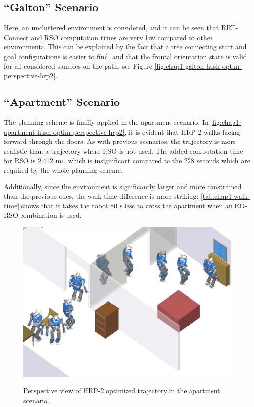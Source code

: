 \subsection{``Galton'' Scenario}
Here, an uncluttered environment is considered, and it can be seen
that RRT-Connect and RSO computation times are very low compared to
other environments. This can be explained by the fact that a tree
connecting start and goal configurations is easier to find, and that
the frontal orientation state is valid for all considered samples on
the path, see Figure \ref{fig:chap1-galton-hash-optim-perspective-hrp2}.

\subsection{``Apartment'' Scenario}
The planning scheme is finally applied in the apartment scenario. In
\autoref{fig:chap1-apartment-hash-optim-perspective-hrp2}, it is
evident that HRP-2 walks facing forward through the doors. As with
previous scenarios, the trajectory is more realistic than a trajectory
where RSO is not used. The added computation time for RSO is 2,412 ms,
which is insignificant compared to the 228 seconds which are required
by the whole planning scheme.

Additionally, since the environment is significantly larger and more
constrained than the previous ones, the walk time difference is more
striking: \autoref{tab:chap1-walk-time} shows that it takes the robot
80 s less to cross the apartment when an RO-RSO combination is used.

\begin{figure}
  \centering
      {\includegraphics[width = 0.8\linewidth]
        {src/chap1-path-optimization/apartment-hash-optim-perspective-hrp2.png}}
      \caption{Perspective view of HRP-2 optimized trajectory in the
        apartment scenario.}
      \label{fig:chap1-apartment-hash-optim-perspective-hrp2}
\end{figure}

